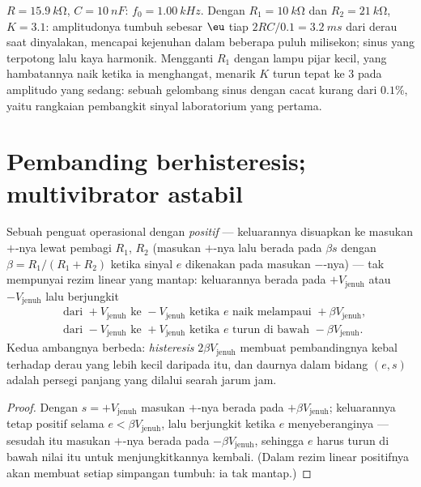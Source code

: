 \begin{example}\label{ex:b2:feedback-oscillators:wiennumbers}
$R = \qty{15.9}{k\ohm}$, $C = \qty{10}{nF}$: $f_0 = \qty{1.00}{kHz}$. Dengan $R_1 =
\qty{10}{k\ohm}$ dan $R_2 = \qty{21}{k\ohm}$, $K = 3.1$: amplitudonya tumbuh sebesar
$\eu$ tiap $2RC/0.1 = \qty{3.2}{ms}$ dari derau saat dinyalakan, mencapai
kejenuhan dalam beberapa puluh milisekon; sinus yang terpotong lalu
kaya harmonik. Mengganti $R_1$ dengan lampu pijar kecil, yang
hambatannya naik ketika ia menghangat, menarik $K$ turun tepat ke $3$ pada
amplitudo yang sedang: sebuah gelombang sinus dengan cacat kurang dari $0.1\%$,
yaitu rangkaian pembangkit sinyal laboratorium yang pertama.
\end{example}

\section{Pembanding berhisteresis; multivibrator astabil}

\begin{proposition}\label{prop:b2:feedback-oscillators:schmitt}
Sebuah penguat operasional dengan  \emph{positif} --- keluarannya disuapkan ke masukan $+$-nya
lewat pembagi $R_1$, $R_2$ (masukan $+$-nya lalu berada pada $\beta s$ dengan
$\beta = R_1/(R_1 + R_2)$ ketika sinyal $e$ dikenakan pada masukan $-$-nya)
--- tak mempunyai rezim linear yang mantap: keluarannya berada pada $+V_{\text{jenuh}}$ atau
$-V_{\text{jenuh}}$ lalu berjungkit
\begin{align*}
&\text{dari } +V_{\text{jenuh}} \text{ ke } -V_{\text{jenuh}} \text{ ketika } e \text{ naik melampaui } +\beta V_{\text{jenuh}} ,\\
&\text{dari } -V_{\text{jenuh}} \text{ ke } +V_{\text{jenuh}} \text{ ketika } e \text{ turun di bawah } -\beta V_{\text{jenuh}} .
\end{align*}
Kedua ambangnya berbeda: \emph{histeresis} $2\beta V_{\text{jenuh}}$ membuat
pembandingnya kebal terhadap derau yang lebih kecil daripada itu, dan daurnya dalam
bidang $(e, s)$ adalah persegi panjang yang dilalui searah jarum jam.
\end{proposition}

\begin{proof}
Dengan $s = +V_{\text{jenuh}}$ masukan $+$-nya berada pada $+\beta V_{\text{jenuh}}$; keluarannya
tetap positif selama $e < \beta V_{\text{jenuh}}$, lalu berjungkit ketika $e$ menyeberanginya
--- sesudah itu masukan $+$-nya berada pada $-\beta V_{\text{jenuh}}$, sehingga $e$ harus
turun di bawah nilai itu untuk menjungkitkannya kembali. (Dalam rezim linear 
positifnya akan membuat setiap simpangan tumbuh: ia tak mantap.)
\end{proof}

